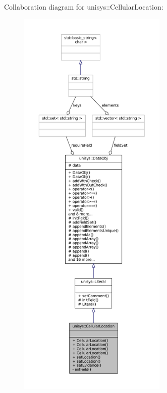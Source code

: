 Collaboration diagram for unisys\-:\-:Cellular\-Location\-:
\nopagebreak
\begin{figure}[H]
\begin{center}
\leavevmode
\includegraphics[height=550pt]{classunisys_1_1CellularLocation__coll__graph}
\end{center}
\end{figure}
